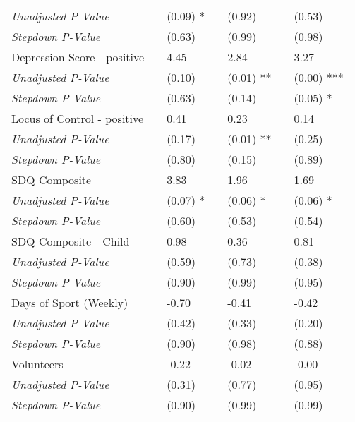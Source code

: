 \begin{tabular}{L{9cm} L{1cm} l L{1cm} l l l}
\quad \textit{Unadjusted P-Value} & & (0.09) * & & (0.92)  & & (0.53) \\
\quad \textit{Stepdown P-Value} & & (0.63)  & & (0.99)  & & (0.98) \\[3pt]
Depression Score - positive & & 4.45 & & 2.84  & & 3.27 \\
\quad \textit{Unadjusted P-Value} & & (0.10)  & & (0.01) ** & & (0.00) *** \\
\quad \textit{Stepdown P-Value} & & (0.63)  & & (0.14)  & & (0.05) * \\[3pt]
Locus of Control - positive & & 0.41 & & 0.23  & & 0.14 \\
\quad \textit{Unadjusted P-Value} & & (0.17)  & & (0.01) ** & & (0.25) \\
\quad \textit{Stepdown P-Value} & & (0.80)  & & (0.15)  & & (0.89) \\[3pt]
SDQ Composite & & 3.83 & & 1.96  & & 1.69 \\
\quad \textit{Unadjusted P-Value} & & (0.07) * & & (0.06) * & & (0.06) * \\
\quad \textit{Stepdown P-Value} & & (0.60)  & & (0.53)  & & (0.54) \\[3pt]
SDQ Composite - Child & & 0.98 & & 0.36  & & 0.81 \\
\quad \textit{Unadjusted P-Value} & & (0.59)  & & (0.73)  & & (0.38) \\
\quad \textit{Stepdown P-Value} & & (0.90)  & & (0.99)  & & (0.95) \\[3pt]
Days of Sport (Weekly) & & -0.70 & & -0.41  & & -0.42 \\
\quad \textit{Unadjusted P-Value} & & (0.42)  & & (0.33)  & & (0.20) \\
\quad \textit{Stepdown P-Value} & & (0.90)  & & (0.98)  & & (0.88) \\[3pt]
Volunteers & & -0.22 & & -0.02  & & -0.00 \\
\quad \textit{Unadjusted P-Value} & & (0.31)  & & (0.77)  & & (0.95) \\
\quad \textit{Stepdown P-Value} & & (0.90)  & & (0.99)  & & (0.99) \\[3pt]
\bottomrule
\end{tabular}
